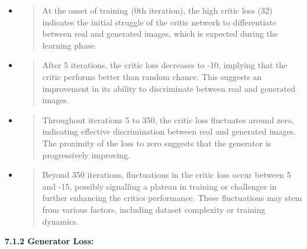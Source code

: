 \documentclass[
]{article}
\begin{document}
\begin{itemize}
\item
  \begin{quote}
  At the onset of training (0th iteration), the high critic loss (32)
  indicates the initial struggle of the critic network to differentiate
  between real and generated images, which is expected during the
  learning phase.
  \end{quote}
\item
  \begin{quote}
  After 5 iterations, the critic loss decreases to -10, implying that
  the critic performs better than random chance. This suggests an
  improvement in its ability to discriminate between real and generated
  images.
  \end{quote}
\item
  \begin{quote}
  Throughout iterations 5 to 350, the critic loss fluctuates around
  zero, indicating effective discrimination between real and generated
  images. The proximity of the loss to zero suggests that the generator
  is progressively improving.
  \end{quote}
\item
  \begin{quote}
  Beyond 350 iterations, fluctuations in the critic loss occur between 5
  and -15, possibly signalling a plateau in training or challenges in
  further enhancing the critic\textquotesingle s performance. These
  fluctuations may stem from various factors, including dataset
  complexity or training dynamics.
  \end{quote}
\end{itemize}

\textbf{7.1.2 Generator Loss:}
\end{document}
